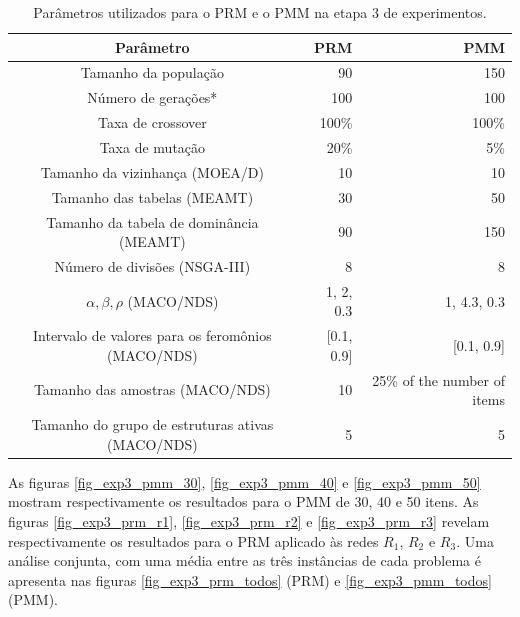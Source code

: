 \begin{table}[!htbp]
	\caption{Parâmetros utilizados para o PRM e o PMM na etapa 3 de experimentos.}
	\label{table_exp3_parametros}
	\begin{center}
		\begin{tabular}{c|r|r}
			\textbf{Parâmetro} & \textbf{PRM} &  \textbf{PMM} \\ %
			\hline
			Tamanho da população               &    90 &      150 \\ %
			Número de gerações*        &   100 &      100 \\ %
			Taxa de crossover                & 100\% &    100\% \\ %
			Taxa de mutação                 &  20\% &      5\% \\ %
			Tamanho da vizinhança (MOEA/D)    &    10 &       10 \\ %
			Tamanho das tabelas (MEAMT)   &    30 &       50 \\ %
			Tamanho da tabela de dominância (MEAMT) &    90 &      150 \\ %
			Número de divisões (NSGA-III)&     8 &        8 \\ %
			$\alpha, \beta, \rho$ (MACO/NDS)& 1, 2, 0.3 & 1, 4.3, 0.3 \\ %
			Intervalo de valores para os feromônios (MACO/NDS)& [0.1, 0.9] & [0.1, 0.9] \\ %
			Tamanho das amostras (MACO/NDS)& 10 &25\% of the number of items \\  %
			Tamanho do grupo de estruturas ativas (MACO/NDS)& 5 & 5 \\
			\hline
		\end{tabular}
	\end{center}
\end{table}

As figuras \ref{fig_exp3_pmm_30}, \ref{fig_exp3_pmm_40} e \ref{fig_exp3_pmm_50} mostram respectivamente os resultados para o PMM de 30, 40 e 50 itens. As figuras \ref{fig_exp3_prm_r1}, \ref{fig_exp3_prm_r2} e \ref{fig_exp3_prm_r3} revelam respectivamente os resultados para o PRM aplicado às redes $R_1$, $R_2$ e $R_3$. Uma análise conjunta, com uma média entre as três instâncias de cada problema é apresenta nas figuras \ref{fig_exp3_prm_todos} (PRM) e \ref{fig_exp3_pmm_todos} (PMM).

